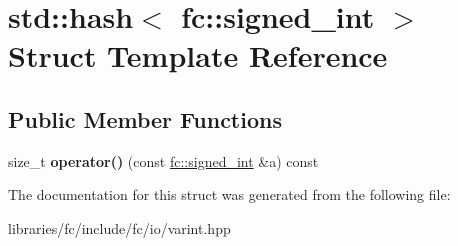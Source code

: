\hypertarget{structstd_1_1hash_3_01fc_1_1signed__int_01_4}{}\section{std\+:\+:hash$<$ fc\+:\+:signed\+\_\+int $>$ Struct Template Reference}
\label{structstd_1_1hash_3_01fc_1_1signed__int_01_4}
\subsection*{Public Member Functions}
\begin{DoxyCompactItemize}
\item 
\mbox{\label{structstd_1_1hash_3_01fc_1_1signed__int_01_4_a8c7710af4a8b57680cedff46a95f8065}} 
size\+\_\+t {\bfseries operator()} (const \mbox{\hyperlink{structfc_1_1signed__int}{fc\+::signed\+\_\+int}} \&a) const
\end{DoxyCompactItemize}


The documentation for this struct was generated from the following file\+:\begin{DoxyCompactItemize}
\item 
libraries/fc/include/fc/io/varint.\+hpp\end{DoxyCompactItemize}
